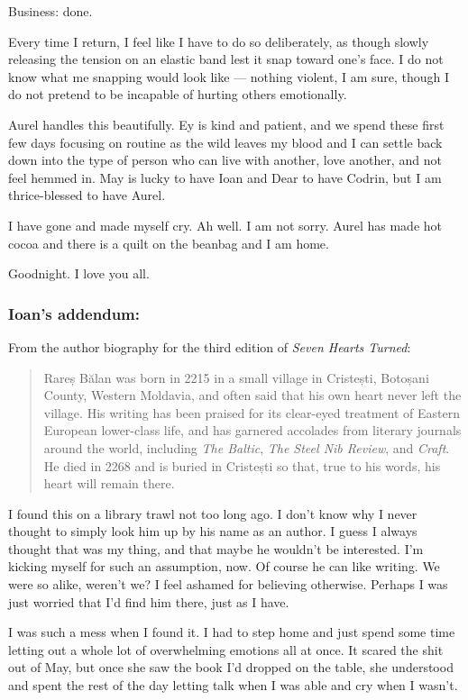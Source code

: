 Business: done.

Every time I return, I feel like I have to do so deliberately, as though slowly releasing the tension on an elastic band lest it snap toward one's face. I do not know what me snapping would look like — nothing violent, I am sure, though I do not pretend to be incapable of hurting others emotionally.

Aurel handles this beautifully. Ey is kind and patient, and we spend these first few days focusing on routine as the wild leaves my blood and I can settle back down into the type of person who can live with another, love another, and not feel hemmed in. May is lucky to have Ioan and Dear to have Codrin, but I am thrice-blessed to have Aurel.

I have gone and made myself cry. Ah well. I am not sorry. Aurel has made hot cocoa and there is a quilt on the beanbag and I am home.

Goodnight. I love you all.

\hypertarget{ioans-addendum}{%
\subsubsection{Ioan's addendum:}\label{ioans-addendum}}

From the author biography for the third edition of \emph{Seven Hearts Turned}:

\begin{quote}
Rareș Bălan was born in 2215 in a small village in Cristești, Botoșani County, Western Moldavia, and often said that his own heart never left the village. His writing has been praised for its clear-eyed treatment of Eastern European lower-class life, and has garnered accolades from literary journals around the world, including \emph{The Baltic}, \emph{The Steel Nib Review}, and \emph{Craft}. He died in 2268 and is buried in Cristești so that, true to his words, his heart will remain there.
\end{quote}

I found this on a library trawl not too long ago. I don't know why I never thought to simply look him up by his name as an author. I guess I always thought that was my thing, and that maybe he wouldn't be interested. I'm kicking myself for such an assumption, now. Of course he can like writing. We were so alike, weren't we? I feel ashamed for believing otherwise. Perhaps I was just worried that I'd find him there, just as I have.

I was such a mess when I found it. I had to step home and just spend some time letting out a whole lot of overwhelming emotions all at once. It scared the shit out of May, but once she saw the book I'd dropped on the table, she understood and spent the rest of the day letting talk when I was able and cry when I wasn't.

